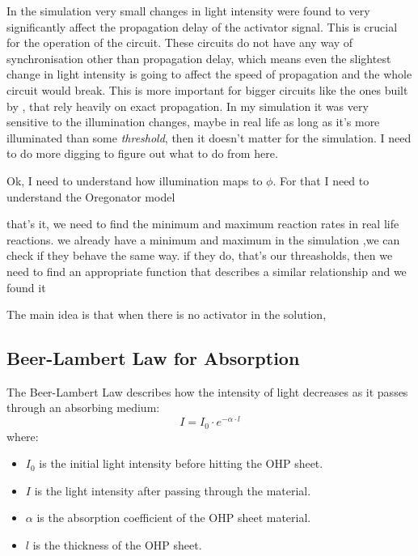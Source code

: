 In the simulation very small changes in light intensity were found to very significantly affect the propagation delay of the activator signal. This is crucial for the operation of the circuit. These circuits do not have any way of synchronisation other than propagation delay, which means even the slightest change in light intensity is going to affect the speed of propagation and the whole circuit would break. This is more important for bigger circuits like the ones built by \cite{StovoldJames2019RaGI}, that rely heavily on exact propagation. 
In my simulation it was very sensitive to the illumination changes, maybe in real life as long as it's more illuminated than some \textit{threshold}, then it doesn't matter for the simulation. I need to do more digging to figure out what to do from here.






Ok, I need to understand how illumination maps to $\phi$. For that I need to understand the Oregonator model


that's it, we need to find the minimum and maximum reaction rates in real life reactions. 
we already have a minimum and maximum in the simulation ,we can check if they behave the same way. if they do, that's our threasholds, then we need to find an appropriate function that describes a similar relationship and we found it


The main idea is that when there is no activator in the solution,  \citep{reddy1995effect}



\subsection*{Beer-Lambert Law for Absorption}
The Beer-Lambert Law describes how the intensity of light decreases as it passes through an absorbing medium:
\[ I = I_0 \cdot e^{-\alpha \cdot l} \]
where:
\begin{itemize}
    \item \(I_0\) is the initial light intensity before hitting the OHP sheet.
    \item \(I\) is the light intensity after passing through the material.
    \item \(\alpha\) is the absorption coefficient of the OHP sheet material.
    \item \(l\) is the thickness of the OHP sheet.
\end{itemize}

